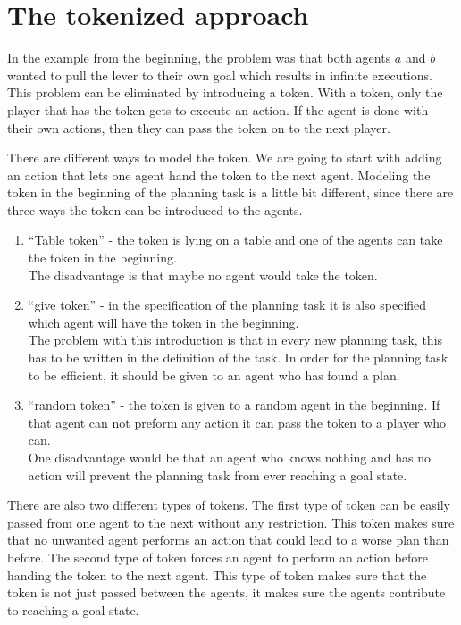 \chapter{The tokenized approach}\label{chap:approach}

In the example from the beginning, the problem was that both agents $a$ and $b$ wanted to pull the lever to their own goal which results in infinite executions. This problem can be eliminated by introducing a token. With a token, only the player that has the token gets to execute an action. If the agent is done with their own actions, then they can pass the token on to the next player.

There are different ways to model the token. We are going to start with adding an action that lets one agent hand the token to the next agent. Modeling the token in the beginning of the planning task is a little bit different, since there are three ways the token can be introduced to the agents.
\begin{enumerate}
  \item ``Table token'' - the token is lying on a table and one of the agents can take the token in the beginning. \\
  The disadvantage is that maybe no agent would take the token.
  \item ``give token'' - in the specification of the planning task it is also specified which agent will have the token in the beginning. \\
  The problem with this introduction is that in every new planning task, this has to be written in the definition of the task. In order for the planning task to be efficient, it should be given to an agent who has found a plan.
  \item ``random token'' - the token is given to a random agent in the beginning. If that agent can not preform any action it can pass the token to a player who can. \\
  One disadvantage would be that an agent who knows nothing and has no action will prevent the planning task from ever reaching a goal state.
\end{enumerate}

There are also two different types of tokens. The first type of token can be easily passed from one agent to the next without any restriction. This token makes sure that no unwanted agent performs an action that could lead to a worse plan than before. The second type of token forces an agent to perform an action before handing the token to the next agent. This type of token makes sure that the token is not just passed between the agents, it makes sure the agents contribute to reaching a goal state.

